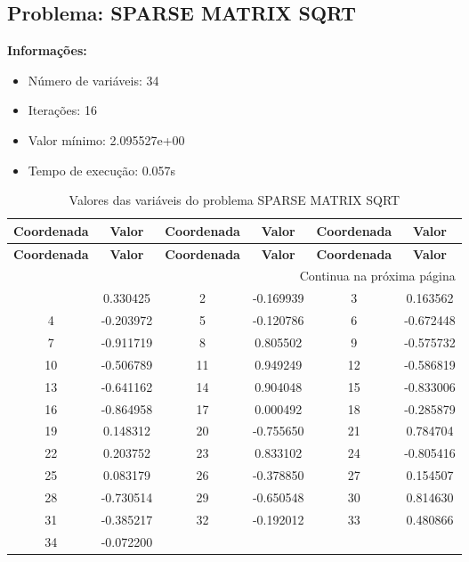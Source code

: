 \documentclass[12pt]{article}
\begin{document}
\newpage            
\subsection{Problema: SPARSE MATRIX SQRT}

\textbf{Informações:}
\begin{itemize}
\item Número de variáveis: 34
\item Iterações: 16
\item Valor mínimo: 2.095527e+00
\item Tempo de execução: 0.057s
\end{itemize}

\small
\begin{longtable}{@{}cc|cc|cc@{}}
\caption{Valores das variáveis do problema SPARSE MATRIX SQRT} \\
\toprule
\textbf{Coordenada} & \textbf{Valor} & \textbf{Coordenada} & \textbf{Valor} & \textbf{Coordenada} & \textbf{Valor} \\
\midrule
\endfirsthead

\toprule
\textbf{Coordenada} & \textbf{Valor} & \textbf{Coordenada} & \textbf{Valor} & \textbf{Coordenada} & \textbf{Valor} \\
\midrule
\endhead

\midrule \multicolumn{6}{r}{{Continua na próxima página}} \\ \midrule
\endfoot

\bottomrule
\endlastfoot
1 & 0.330425 & 2 & -0.169939 & 3 & 0.163562 \\
4 & -0.203972 & 5 & -0.120786 & 6 & -0.672448 \\
7 & -0.911719 & 8 & 0.805502 & 9 & -0.575732 \\
10 & -0.506789 & 11 & 0.949249 & 12 & -0.586819 \\
13 & -0.641162 & 14 & 0.904048 & 15 & -0.833006 \\
16 & -0.864958 & 17 & 0.000492 & 18 & -0.285879 \\
19 & 0.148312 & 20 & -0.755650 & 21 & 0.784704 \\
22 & 0.203752 & 23 & 0.833102 & 24 & -0.805416 \\
25 & 0.083179 & 26 & -0.378850 & 27 & 0.154507 \\
28 & -0.730514 & 29 & -0.650548 & 30 & 0.814630 \\
31 & -0.385217 & 32 & -0.192012 & 33 & 0.480866 \\
34 & -0.072200 &  &  &  &  \\

\end{longtable}
\end{document}
